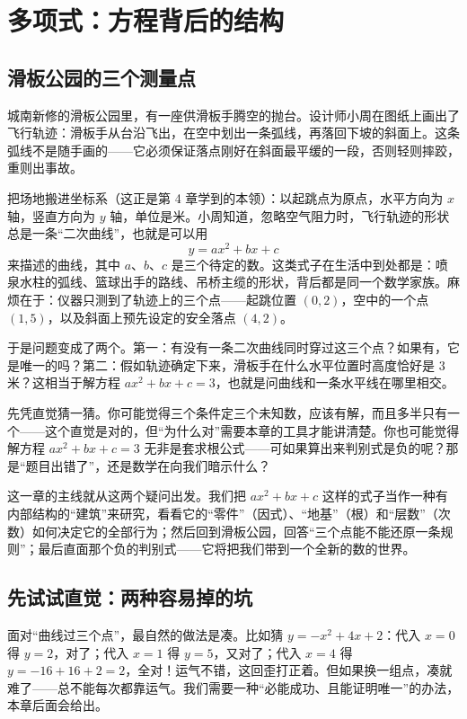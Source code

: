 \chapter{多项式：方程背后的结构}

\section{滑板公园的三个测量点}

城南新修的滑板公园里，有一座供滑板手腾空的抛台。设计师小周在图纸上画出了飞行轨迹：滑板手从台沿飞出，在空中划出一条弧线，再落回下坡的斜面上。这条弧线不是随手画的——它必须保证落点刚好在斜面最平缓的一段，否则轻则摔跤，重则出事故。

把场地搬进坐标系（这正是第 4 章学到的本领）：以起跳点为原点，水平方向为 $x$ 轴，竖直方向为 $y$ 轴，单位是米。小周知道，忽略空气阻力时，飞行轨迹的形状总是一条“二次曲线”，也就是可以用
\[
y = ax^2 + bx + c
\]
来描述的曲线，其中 $a$、$b$、$c$ 是三个待定的数。这类式子在生活中到处都是：喷泉水柱的弧线、篮球出手的路线、吊桥主缆的形状，背后都是同一个数学家族。麻烦在于：仪器只测到了轨迹上的三个点——起跳位置 $(0, 2)$，空中的一个点 $(1, 5)$，以及斜面上预先设定的安全落点 $(4, 2)$。

于是问题变成了两个。第一：有没有一条二次曲线同时穿过这三个点？如果有，它是唯一的吗？第二：假如轨迹确定下来，滑板手在什么水平位置时高度恰好是 $3$ 米？这相当于解方程 $ax^2+bx+c=3$，也就是问曲线和一条水平线在哪里相交。

先凭直觉猜一猜。你可能觉得三个条件定三个未知数，应该有解，而且多半只有一个——这个直觉是对的，但“为什么对”需要本章的工具才能讲清楚。你也可能觉得解方程 $ax^2+bx+c=3$ 无非是套求根公式——可如果算出来判别式是负的呢？那是“题目出错了”，还是数学在向我们暗示什么？

这一章的主线就从这两个疑问出发。我们把 $ax^2+bx+c$ 这样的式子当作一种有内部结构的“建筑”来研究，看看它的“零件”（因式）、“地基”（根）和“层数”（次数）如何决定它的全部行为；然后回到滑板公园，回答“三个点能不能还原一条规则”；最后直面那个负的判别式——它将把我们带到一个全新的数的世界。

\section{先试试直觉：两种容易掉的坑}

面对“曲线过三个点”，最自然的做法是凑。比如猜 $y = -x^2 + 4x + 2$：代入 $x=0$ 得 $y=2$，对了；代入 $x=1$ 得 $y=5$，又对了；代入 $x=4$ 得 $y = -16+16+2 = 2$，全对！运气不错，这回歪打正着。但如果换一组点，凑就难了——总不能每次都靠运气。我们需要一种“必能成功、且能证明唯一”的办法，本章后面会给出。


